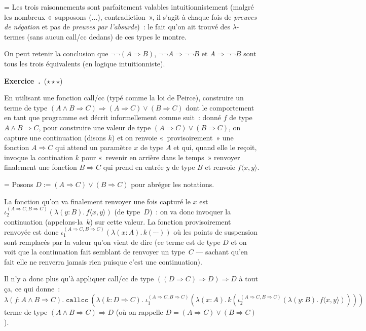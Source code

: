 \documentclass[12pt,a4paper]{article}
\theoremstyle{definition}
\newcommand\exercice{%
\refstepcounter{comcnt}\bigskip\noindent\textbf{Exercice~\thecomcnt.}}
\newif\ifcorrige
\newenvironment{corrige}%
{\ifcorrige\relax\else\setbox0=\vbox\bgroup\fi%
\smallbreak\footnotesize\noindent{\underbar{\textit{Corrigé.}}\quad}}
{{\hbox{}\nobreak\hfill\checkmark}%
\ifcorrige\relax\else\egroup\fi\par}
\begin{document}
\begin{corrige}
Les trois raisonnements sont parfaitement valables intuitionnistement
(malgré les nombreux « supposons (...), contradiction », il s'agit à
chaque fois de \emph{preuves de négation} et pas de \emph{preuves par
l'absurde}) : le fait qu'on ait trouvé des $\lambda$-termes (sans
aucun call/cc dedans) de ces types le montre.

On peut retenir la conclusion que $\neg\neg(A\Rightarrow B)$,
$\neg\neg A\Rightarrow\neg\neg B$ et $A\Rightarrow\neg\neg B$ sont
tous les trois équivalents (en logique intuitionniste).
\end{corrige}

%

\exercice\ (${\star}{\star}{\star}$)\par\nobreak

En utilisant une fonction call/cc (typé comme la loi de Peirce),
construire un terme de type $(A\land B \Rightarrow C) \Rightarrow
(A\Rightarrow C) \lor (B\Rightarrow C)$ dont le comportement en tant
que programme est décrit informellement comme suit : donné $f$ de type
$A\land B \Rightarrow C$, pour construire une valeur de type
$(A\Rightarrow C) \lor (B\Rightarrow C)$, on capture une continuation
(disons $k$) et on renvoie « provisoirement » une fonction
$A\Rightarrow C$ qui attend un paramètre $x$ de type $A$ et qui, quand
elle le reçoit, invoque la contination $k$ pour « revenir en arrière
dans le temps » renvoyer finalement une fonction $B\Rightarrow C$ qui
prend en entrée $y$ de type $B$ et renvoie $f\langle x,y\rangle$.

\begin{corrige}
Posons $D := (A\Rightarrow C) \lor (B\Rightarrow C)$ pour abréger les
notations.

La fonction qu'on va finalement renvoyer une fois capturé le $x$ est
$\iota_2^{(A\Rightarrow C, B\Rightarrow C)}(\lambda (y:B).\,f\langle
x,y\rangle)$ (de type $D$) : on va donc invoquer la continuation
(appelons-la $k$) sur cette valeur.  La fonction provisoirement
renvoyée est donc $\iota_1^{(A\Rightarrow C, B\Rightarrow C)}(\lambda
(x:A).\,k(\cdots))$ où les points de suspension sont remplacés par la
valeur qu'on vient de dire (ce terme est de type $D$ et on voit que la
continuation fait semblant de renvoyer un type $C$ — sachant qu'en
fait elle ne renverra jamais rien puisque c'est une continuation).

Il n'y a donc plus qu'à appliquer call/cc de type $((D\Rightarrow
C)\Rightarrow D)\Rightarrow D$ à tout ça, ce qui donne :
\[
\lambda(f:A\land B \Rightarrow C).\;
\texttt{callcc}~(
\lambda(k:D \Rightarrow C).\;\iota_1^{(A\Rightarrow C, B\Rightarrow C)}(\lambda
(x:A).\,k(\iota_2^{(A\Rightarrow C, B\Rightarrow C)}(\lambda (y:B).\,f\langle
x,y\rangle))))
\]
terme de type $(A\land B \Rightarrow C) \Rightarrow D$ (où on rappelle
$D = (A\Rightarrow C) \lor (B\Rightarrow C)$).
\end{corrige}
\end{document}
